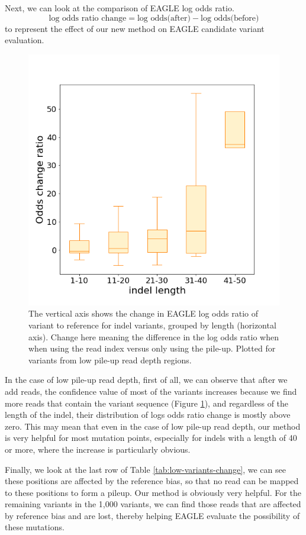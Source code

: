 Next, we can look at the comparison of EAGLE log odds ratio.
\begin{equation*}
\text{log odds ratio change} = \text{log odds(after)} - \text{log odds(before)}
\end{equation*}
to represent the effect of our new method on EAGLE candidate variant evaluation.

\vspace{1cm}
\begin{figure}[H]
    \centering
    \includegraphics[width=0.6\columnwidth]{body/image/low_odds_change.png}
    \captionsetup{labelfont=bf}
    \renewcommand{\baselinestretch}{1.0}
    \caption[low pile-up read depth odds change ratio]{The vertical axis shows the change in EAGLE log odds ratio of variant to reference for indel variants, grouped by length (horizontal axis).  Change here meaning the difference in the log odds ratio when when using the read index versus only using the pile-up.  Plotted for variants from low pile-up read depth regions.}
    \label{low_odds_change}
\end{figure}

In the case of low pile-up read depth, first of all, we can observe that after we add reads, the confidence value of most of the variants increases because we find more reads that contain the variant sequence (Figure \ref{low_odds_change}), and regardless of the length of the indel, their distribution of logs odds ratio change is mostly above zero.
This may mean that even in the case of low pile-up read depth, our method is very helpful for most mutation points, especially for indels with a length of 40 or more, where the increase is particularly obvious.

Finally, we look at the last row of Table \ref{tab:low-variants-change}, we can see these positions are affected by the reference bias, so that no read can be mapped to these positions to form a pileup. Our method is obviously very helpful. For the remaining variants in the 1,000 variants, we can find those reads that are affected by reference bias and are lost, thereby helping EAGLE evaluate the possibility of these mutations.

